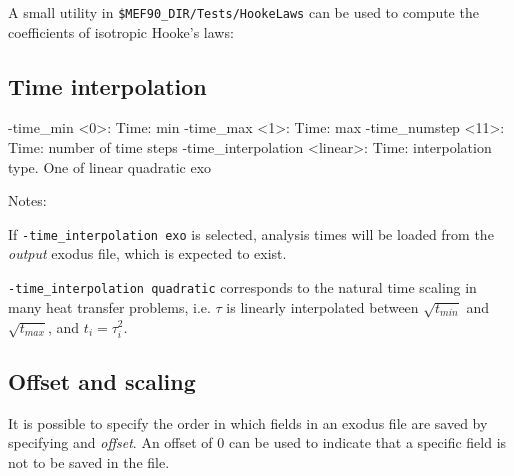 \documentclass[10pt,oneside]{memoir}
\begin{document}
A small utility in \verb+$MEF90_DIR/Tests/HookeLaws+ can be used to compute the coefficients of isotropic Hooke's laws:



\subsection{Time interpolation}
\small{
\begin{boxedverbatim}
-time_min <0>: Time: min 
-time_max <1>: Time: max 
-time_numstep <11>: Time: number of time steps 
-time_interpolation <linear>: Time: interpolation type. One of linear quadratic exo
\end{boxedverbatim}
}
Notes: 
\begin{compactenum}
	\item If \verb+-time_interpolation exo+ is selected, analysis times will be loaded from the \emph{output} exodus file, which is expected to exist.
	\item \verb+-time_interpolation quadratic+ corresponds to the natural time scaling in many heat transfer problems, i.e. $\tau$ is linearly interpolated between $$ and $$, and $t_i = \tau_i^2$.
\end{compactenum}

\subsection{Offset and scaling}
It is possible to specify the order in which fields in an exodus file are saved by specifying and \emph{offset}. An offset of 0 can be used to indicate that a specific field is not to be saved in the file.
\end{document}
